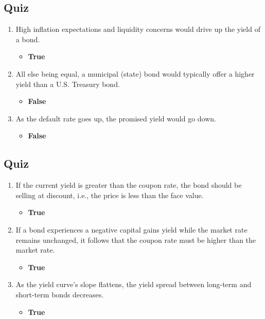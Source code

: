 \begin{tiny}
  \subsection{Quiz}
  \begin{enumerate}[itemsep=-0.5em]
    \item High inflation expectations and liquidity concerns would drive up the yield of a bond.
          \begin{itemize}[itemsep=-0.2em]
            \item \textbf{True}
          \end{itemize}
    \item All else being equal, a municipal (state) bond would typically offer a higher yield than a U.S. Treasury bond.
          \begin{itemize}[itemsep=-0.2em]
            \item \textbf{False}
          \end{itemize}
    \item As the default rate goes up, the promised yield would go down.
          \begin{itemize}[itemsep=-0.2em]
            \item \textbf{False}
          \end{itemize}
  \end{enumerate}
  \subsection{Quiz}
  \begin{enumerate}[itemsep=-0.5em]
    \item If the current yield is greater than the coupon rate, the bond should be selling at discount, i.e., the price is less than the face value.
          \begin{itemize}[itemsep=-0.2em]
            \item \textbf{True}
          \end{itemize}
    \item If a bond experiences a negative capital gains yield while the market rate remains unchanged, it follows that the coupon rate must be higher than the market rate.
          \begin{itemize}[itemsep=-0.2em]
            \item \textbf{True}
          \end{itemize}
    \item As the yield curve's slope flattens, the yield spread between long-term and short-term bonds decreases.
          \begin{itemize}[itemsep=-0.2em]
            \item \textbf{True}
          \end{itemize}
  \end{enumerate}

\end{tiny}

